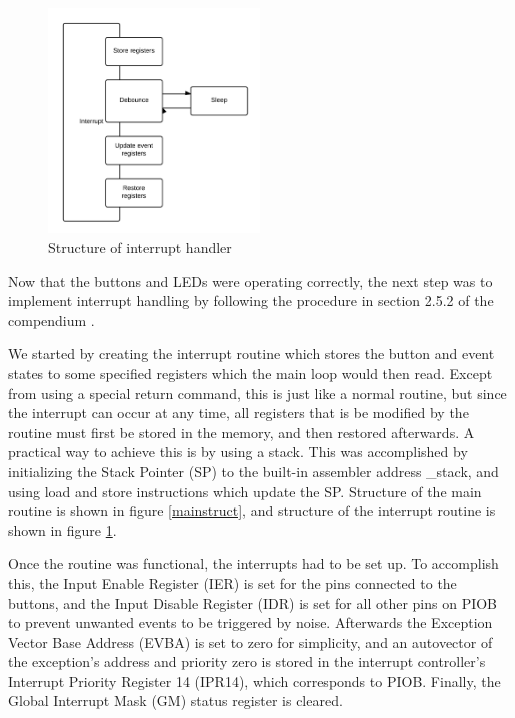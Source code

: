 \begin{figure}[phtb]
  \centering
    \includegraphics[width=0.5\textwidth]{Interrupt}
  \caption{Structure of interrupt handler}
  \label{interruptstruct}
\end{figure}

Now that the buttons and LEDs were operating correctly, the next step was to implement interrupt handling by following the procedure in section 2.5.2 of the compendium \cite{compendium}.

We started by creating the interrupt routine which stores the button and event states to some specified registers which the main loop would then read. Except from using a special return command, this is just like a normal routine, but since the interrupt can occur at any time, all registers that is be modified by the routine must first be stored in the memory, and then restored afterwards. A practical way to achieve this is by using a stack. This was accomplished by initializing the Stack Pointer (SP) to the built-in assembler address \_stack, and using load and store instructions which update the SP. Structure of the main routine is shown in figure \ref{mainstruct}, and structure of the interrupt routine is shown in figure \ref{interruptstruct}.

Once the routine was functional, the interrupts had to be set up. To accomplish this, the Input Enable Register (IER) is set for the pins connected to the buttons, and the Input Disable Register (IDR) is set for all other pins on PIOB to prevent unwanted events to be triggered by noise. Afterwards the Exception Vector Base Address (EVBA) is set to zero for simplicity, and an autovector of the exception’s address and priority zero is stored in the interrupt controller’s Interrupt Priority Register 14 (IPR14), which corresponds to PIOB. Finally, the Global Interrupt Mask (GM) status register is cleared.

